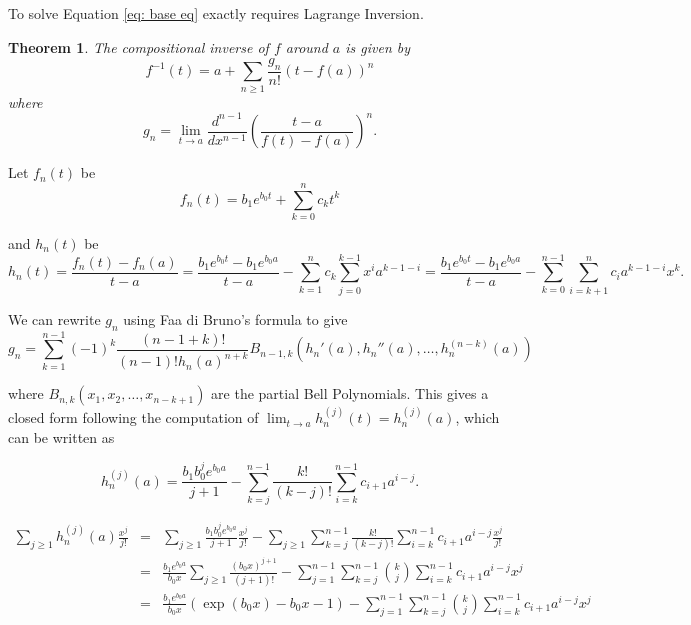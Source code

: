 \documentclass[12pt]{article}
\theoremstyle{plain}
\newtheorem{thm}{Theorem}
\theoremstyle{definition}
\theoremstyle{remark}
\theoremstyle{definition}
\begin{document}
To solve Equation \ref{eq: base eq} exactly requires Lagrange Inversion. 

\begin{thm} \label{thm: lagrange inversion}
The compositional inverse of $f$ around $a$ is given by
\begin{equation*}
    f^{-1}(t) = a + \sum_{n\geq1}\frac{g_n}{n!}(t-f(a))^n
\end{equation*}
where 
\begin{equation*}
    g_n = \lim_{t \to a}\frac{d^{n-1}}{dx^{n-1}}\left(\frac{t-a}{f(t)-f(a)}\right)^{n}.
\end{equation*}    
\end{thm}

Let $f_n(t)$ be 
\begin{equation*}
    f_n(t) = b_1 e^{b_0 t} + \sum_{k=0}^n c_k t^k
\end{equation*}

and $h_n(t)$ be
\begin{equation*}
    h_n(t) = \frac{f_n(t)-f_n(a)}{t-a} = \frac{b_1 e^{b_0 t} - b_1 e^{b_0 a}}{t-a} - \sum_{k=1}^n c_k \sum_{j=0}^{k-1}x^i a^{k-1-i} = \frac{b_1 e^{b_0 t} - b_1 e^{b_0 a}}{t-a} - \sum_{k=0}^{n-1}\sum_{i=k+1}^{n}c_i a^{k-1-i} x^{k}.
\end{equation*}

We can rewrite $g_n$ using Faa di Bruno's formula to give 
\begin{equation*}
    g_n = \sum_{k=1}^{n-1}(-1)^k\frac{(n-1+k)!}{(n-1)!h_n(a)^{n+k}}B_{n-1,k
    }(h_n'(a), h_n''(a), \dots, h_n^{(n-k)}(a))
\end{equation*}

where $B_{n,k}(x_1, x_2, \dots, x_{n-k+1})$ are the partial Bell Polynomials. This gives a closed form following the computation of $\lim_{t \to a}h_n^{(j)}(t) = h_n^{(j)}(a)$, which can be written as

\begin{equation*}
    h_n^{(j)}(a) = \frac{b_1 b_0^j e^{b_0 a}}{j+1} - \sum_{k=j}^{n-1} \frac{k!}{(k-j)!} \sum_{i=k}^{n-1} c_{i+1} a^{i-j}.
\end{equation*}

\begin{eqnarray*}
    \sum_{j \geq 1} h_n^{(j)}(a) \frac{x^j}{j!} & = & \sum_{j \geq 1} \frac{b_1 b_0^j e^{b_0 a}}{j+1} \frac{x^j}{j!} - \sum_{j \geq 1}\sum_{k=j}^{n-1} \frac{k!}{(k-j)!} \sum_{i=k}^{n-1} c_{i+1} a^{i-j}\frac{x^j}{j!} \\
    & = & \frac{b_1 e^{b_0 a}}{b_0 x} \sum_{j \geq 1} \frac{(b_0 x)^{j+1}}{(j+1)!} - \sum_{j = 1}^{n-1}\sum_{k=j}^{n-1} \binom{k}{j} \sum_{i=k}^{n-1} c_{i+1} a^{i-j}x^j\\
    & = & \frac{b_1 e^{b_0 a}}{b_0 x} (\exp(b_0 x) - b_0 x -1) - \sum_{j = 1}^{n-1}\sum_{k=j}^{n-1} \binom{k}{j} \sum_{i=k}^{n-1} c_{i+1} a^{i-j}x^j\\
\end{eqnarray*}
\end{document}
